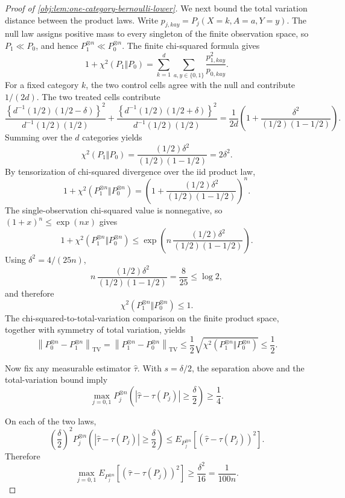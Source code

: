 \begin{proof}[Proof of \cref{obj:lem:one-category-bernoulli-lower}]
We next bound the total variation distance between the product laws. Write
\(p_{j,kay}=P_j(X=k,A=a,Y=y)\). The null law assigns positive mass to every singleton of the finite observation space, so \(P_1\ll P_0\), and hence \(P_1^{\otimes n}\ll P_0^{\otimes n}\). The finite chi-squared formula gives
\[
1+\chi^2(P_1\Vert P_0)
=\sum_{k=1}^d\sum_{a,y\in\{0,1\}}\frac{p_{1,kay}^2}{p_{0,kay}} .
\]
For a fixed category \(k\), the two control cells agree with the null and contribute \(1/(2d)\). The two treated cells contribute
\[
\frac{\left\{d^{-1}(1/2)(1/2-\delta)\right\}^2}{d^{-1}(1/2)(1/2)}
+
\frac{\left\{d^{-1}(1/2)(1/2+\delta)\right\}^2}{d^{-1}(1/2)(1/2)}
=
\frac{1}{2d}\left(1+\frac{\delta^2}{(1/2)(1-1/2)}\right).
\]
Summing over the \(d\) categories yields
\[
\chi^2(P_1\Vert P_0)
=
\frac{(1/2)\delta^2}{(1/2)(1-1/2)}
=2\delta^2 .
\]
By tensorization of chi-squared divergence over the iid product law,
\[
1+\chi^2\!\left(P_1^{\otimes n}\Vert P_0^{\otimes n}\right)
=
\left(1+\frac{(1/2)\delta^2}{(1/2)(1-1/2)}\right)^n .
\]
The single-observation chi-squared value is nonnegative, so \((1+x)^n\le \exp(nx)\) gives
\[
1+\chi^2\!\left(P_1^{\otimes n}\Vert P_0^{\otimes n}\right)
\le
\exp\!\left(
n\,\frac{(1/2)\delta^2}{(1/2)(1-1/2)}
\right).
\]
Using \(\delta^2=4/(25n)\),
\[
n\,\frac{(1/2)\delta^2}{(1/2)(1-1/2)}
=
\frac{8}{25}
\le
\log 2,
\]
and therefore
\[
\chi^2\!\left(P_1^{\otimes n}\Vert P_0^{\otimes n}\right)\le1.
\]
The chi-squared-to-total-variation comparison on the finite product space, together with symmetry of total variation, yields
\[
\left\|P_0^{\otimes n}-P_1^{\otimes n}\right\|_{\mathrm{TV}}
=
\left\|P_1^{\otimes n}-P_0^{\otimes n}\right\|_{\mathrm{TV}}
\le
\frac12\sqrt{\chi^2\!\left(P_1^{\otimes n}\Vert P_0^{\otimes n}\right)}
\le
\frac12 .
\]

Now fix any measurable estimator \(\widehat\tau\). With \(s=\delta/2\), the separation above and the total-variation bound imply
\[
\max_{j=0,1}
P_j^{\otimes n}\left(
|\widehat\tau-\tau(P_j)|\ge \frac{\delta}{2}
\right)
\ge \frac14 .
\]

On each of the two laws,
\[
\left(\frac{\delta}{2}\right)^2
P_j^{\otimes n}\left(
|\widehat\tau-\tau(P_j)|\ge \frac{\delta}{2}
\right)
\le
E_{P_j^{\otimes n}}\!\left[(\widehat\tau-\tau(P_j))^2\right].
\]
Therefore
\[
\max_{j=0,1}
E_{P_j^{\otimes n}}\!\left[(\widehat\tau-\tau(P_j))^2\right]
\ge
\frac{\delta^2}{16}
=
\frac{1}{100n}.
\]


\end{proof}
